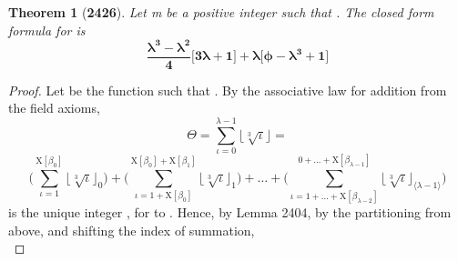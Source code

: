 \documentclass[preview]{standalone}
\newtheorem*{theorem*}{Theorem}
\begin{document}
\begin{theorem*}[\textbf{2426}]
    Let m be a positive integer such that 
    \bm{$\big \lfloor \sqrt[3] \phi \big \rfloor = \lambda$}.
    The closed form formula for 
    is 
    \begin{equation*}
        \bm{
            \frac{
                \lambda ^3 - \lambda ^2
            }
            {4}
            \Bigg[ 3 \lambda + 1 \Bigg]
                + 
            \lambda
            \Bigg[
                \phi - \lambda ^3 + 1
            \Bigg]
        }
    \end{equation*}
\end{theorem*}

\begin{proof}
    Let  be the function 
    such that .
    By the associative law for addition from the field axioms,
    \begin{equation*}
        \Theta
            =
        \sum_{\iota=0}^{\lambda - 1}
                \big \lfloor \sqrt[3] \iota \big \rfloor
            =
    \end{equation*}
    \begin{equation*}
        \Bigg(
            \sum_{ \iota = 1 }^{ \mathrm{X} [\beta_0] }
                \big \lfloor \sqrt[3] \iota \big \rfloor_0
        \Bigg)
            +
        \Bigg(
            \sum_{
                \iota = 1 + \mathrm{X}[\beta_0]
            }^{ 
                \mathrm{X}[\beta_0] + \mathrm{X}[\beta_1]
            }
                \big \lfloor \sqrt[3] \iota \big \rfloor_1
        \Bigg)
            +
        \dots
            +
        \Bigg(
            \sum_{
                \iota = 1 + \dots 
                    + 
                \mathrm{X}[\beta_{\lambda - 2}]
            }^{ 
                0 + \dots
                    +
                \mathrm{X}[\beta_{ \lambda - 1 }]
            }
                \big \lfloor \sqrt[3] \iota \big \rfloor_{ \langle \lambda - 1 \rangle }
        \Bigg)
    \end{equation*}
    \bm{$\big \lfloor \sqrt[3] \iota \big \rfloor_\tau$}
    is the unique integer \bm{$\beta_\tau$},
    for  to 
    \bm{$\big \langle \lambda - 1 \big \rangle$}.
    Hence, by Lemma 2404,
    by the partitioning from above, 
    and shifting the index of summation,
    \begin{equation*}

\end{equation*}
\end{proof}
\end{document}
